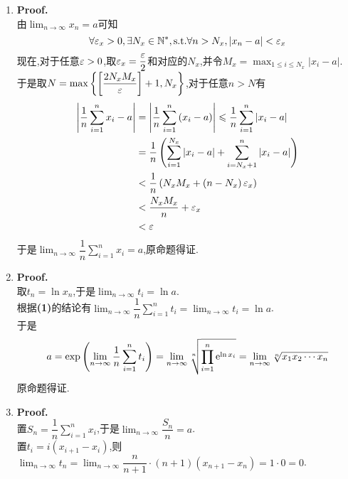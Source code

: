 \documentclass{ctexart}
\begin{document}
\begin{solution}
    \begin{enumerate}[label=\textbf{(\arabic*)}]
        \item \textbf{Proof.}\\
            由$\displaystyle\lim_{n\to\infty}x_n=a$可知
            $$\forall\varepsilon_x>0,\exists N_x\in\mathbb{N}^*,\text{s.t.}\forall n>N_x,\left|x_n-a\right|<\varepsilon_x$$
            现在,对于任意$\varepsilon>0$,取$\varepsilon_x=\dfrac{\varepsilon}{2}$和对应的$N_x$,并令$\displaystyle M_x=\max_{1\leqslant i\leqslant N_x}\left|x_i-a\right|$.\\
            于是取$N=\max\left\{\left[\dfrac{2N_xM_x}{\varepsilon}\right]+1,N_x\right\}$,对于任意$n>N$有
            $$\begin{aligned}
                \left|\dfrac{1}{n}\sum_{i=1}^{n}x_i-a\right|
                &= \left|\dfrac{1}{n}\sum_{i=1}^{n}\left(x_i-a\right)\right|\leqslant\dfrac{1}{n}\sum_{i=1}^{n}\left|x_i-a\right| \\
                &= \dfrac{1}{n}\left(\sum_{i=1}^{N_x}\left|x_i-a\right|+\sum_{i=N_x+1}^{n}\left|x_i-a\right|\right) \\
                &< \dfrac{1}{n}\left(N_xM_x+\left(n-N_x\right)\varepsilon_x\right) \\
                &< \dfrac{N_xM_x}{n}+\varepsilon_x \\
                &< \varepsilon
            \end{aligned}$$
            于是$\displaystyle\lim_{n\to\infty}\dfrac{1}{n}\sum_{i=1}^nx_i=a$,原命题得证.
        \item \textbf{Proof.}\\
            取$t_n=\ln x_n$,于是$\displaystyle\lim_{n\to\infty}t_i=\ln a$.\\
            根据\textbf{(1)}的结论有$\displaystyle\lim_{n\to\infty}\dfrac{1}{n}\sum_{i=1}^{n}t_i=\lim_{n\to\infty}t_i=\ln a$.\\
            于是$$a=\text{exp}\left(\lim_{n\to\infty}\dfrac{1}{n}\sum_{i=1}^{n}t_i\right)=\lim_{n\to\infty}\sqrt[n]{\prod_{i=1}^n\mathrm{e}^{\ln x_i}}=\lim_{n\to\infty}\sqrt[n]{x_1x_2\cdots x_n}$$
            原命题得证.
        \item \textbf{Proof.}\\
            置$\displaystyle S_n=\dfrac{1}{n}\sum_{i=1}^{n}x_i$,于是$\displaystyle\lim_{n\to\infty}\dfrac{S_n}{n}=a$.\\
            置$t_i=i(x_{i+1}-x_{i})$,则$\displaystyle\lim_{n\to\infty}t_n=\lim_{n\to\infty}\dfrac{n}{n+1}\cdot (n+1)\left(x_{n+1}-x_n\right)=1\cdot0=0$.\\

\end{enumerate}
\end{solution}
\end{document}
